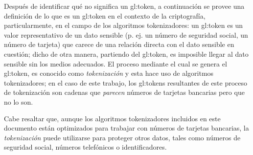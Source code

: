 Después de identificar qué no significa un \gls{gl:token}, a continuación se
provee una definición de lo que es un \gls{gl:token} en el contexto de la
criptografía, particularmente, en el campo de los algoritmos tokenizadores: un
\gls{gl:token} es un valor representativo de un dato sensible (p. ej. un
número de seguridad social, un número de tarjeta) que carece de una relación
directa con el dato sensible en cuestión; dicho de otra manera, partiendo del
\gls{gl:token}, es imposible llegar al dato sensible sin los medios adecuados.
El proceso mediante el cual se genera el \gls{gl:token}, es conocido como
\textit{tokenización} y esta hace uso de algoritmos tokenizadores; en el caso
de este trabajo, los \glspl{gl:token} resultantes de este proceso de
tokenización son cadenas que \textit{parecen} números de tarjetas bancarias
pero que no lo son.

Cabe resaltar que, aunque los algoritmos tokenizadores incluidos en este
documento están optimizados para trabajar con números de tarjetas bancarias,
la \textit{tokenización} puede utilizarse para proteger otros datos, tales
como números de seguridad social, números telefónicos o identificadores.
